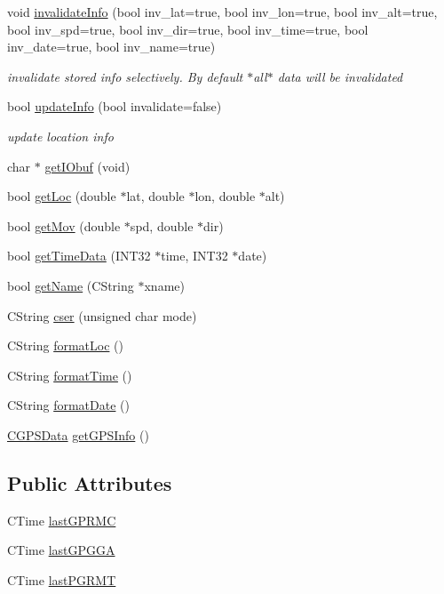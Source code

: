 \begin{DoxyCompactItemize}
void \hyperlink{classCRPGarmCom_a240c353e44f4a04b8eac224aebc69a08}{invalidateInfo} (bool inv\_\-lat=true, bool inv\_\-lon=true, bool inv\_\-alt=true, bool inv\_\-spd=true, bool inv\_\-dir=true, bool inv\_\-time=true, bool inv\_\-date=true, bool inv\_\-name=true)
\begin{DoxyCompactList}\small\item\em invalidate stored info selectively. By default $\ast$all$\ast$ data will be invalidated \item\end{DoxyCompactList}\item 
bool \hyperlink{classCRPGarmCom_a6aca8dd2f254f68580e77e6f56f384e5}{updateInfo} (bool invalidate=false)
\begin{DoxyCompactList}\small\item\em update location info \item\end{DoxyCompactList}\item 
char $\ast$ \hyperlink{classCRPGarmCom_a1cc429ea88124e2eceb110d26f74f94c}{getIObuf} (void)
\item 
bool \hyperlink{classCRPGarmCom_ad16fbe473e60979eb7c73db9912153ff}{getLoc} (double $\ast$lat, double $\ast$lon, double $\ast$alt)
\item 
bool \hyperlink{classCRPGarmCom_a6a7cb254b7d20328ad72106a6b736dda}{getMov} (double $\ast$spd, double $\ast$dir)
\item 
bool \hyperlink{classCRPGarmCom_a9b03b1649a9710e50593ac16020212ae}{getTimeData} (INT32 $\ast$time, INT32 $\ast$date)
\item 
bool \hyperlink{classCRPGarmCom_a7a0c002ccffafe6dbe5ab600b7555279}{getName} (CString $\ast$xname)
\item 
CString \hyperlink{classCRPGarmCom_ae751232dc2959d6bab5f9e5348360706}{cser} (unsigned char mode)
\item 
CString \hyperlink{classCRPGarmCom_aa3efe9b25d2264d9198e41b3884b7f65}{formatLoc} ()
\item 
CString \hyperlink{classCRPGarmCom_ac72f1117caee1fb4c493976b364599d9}{formatTime} ()
\item 
CString \hyperlink{classCRPGarmCom_ae83c84b67bb967c03b5080862fea8fa1}{formatDate} ()
\item 
\hyperlink{classCGPSData}{CGPSData} \hyperlink{classCRPGarmCom_a233cf8478f890623393df0b172a5e743}{getGPSInfo} ()
\end{DoxyCompactItemize}
\subsection*{Public Attributes}
\begin{DoxyCompactItemize}
\item 
CTime \hyperlink{classCRPGarmCom_a77709891a71132ed0f4673d6fb3bbdf2}{lastGPRMC}
\item 
CTime \hyperlink{classCRPGarmCom_a8a982dc5a3c374108e95d94a3a968c9b}{lastGPGGA}
\item 
CTime \hyperlink{classCRPGarmCom_ac23675cb58d274ca7ff1f20027feb314}{lastPGRMT}
\end{DoxyCompactItemize}
